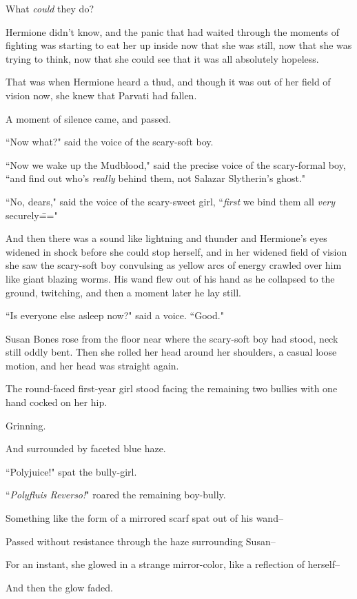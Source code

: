 What \emph{could} they do?

Hermione didn't know, and the panic that had waited through the moments of fighting was starting to eat her up inside now that she was still, now that she was trying to think, now that she could see that it was all absolutely hopeless.

That was when Hermione heard a thud, and though it was out of her field of vision now, she knew that Parvati had fallen.

A moment of silence came, and passed.

``Now what?" said the voice of the scary-soft boy.

``Now we wake up the Mudblood," said the precise voice of the scary-formal boy, ``and find out who's \emph{really} behind them, not Salazar Slytherin's ghost."

``No, dears," said the voice of the scary-sweet girl, ``\emph{first} we bind them all \emph{very} securely\==="

And then there was a sound like lightning and thunder and Hermione's eyes widened in shock before she could stop herself, and in her widened field of vision she saw the scary-soft boy convulsing as yellow arcs of energy crawled over him like giant blazing worms. His wand flew out of his hand as he collapsed to the ground, twitching, and then a moment later he lay still.

``Is everyone else asleep now?" said a voice. ``Good."

Susan Bones rose from the floor near where the scary-soft boy had stood, neck still oddly bent. Then she rolled her head around her shoulders, a casual loose motion, and her head was straight again.

The round-faced first-year girl stood facing the remaining two bullies with one hand cocked on her hip.

Grinning.

And surrounded by faceted blue haze.

``Polyjuice!" spat the bully-girl.

``\emph{Polyfluis Reverso!}" roared the remaining boy-bully.

Something like the form of a mirrored scarf spat out of his wand\---

Passed without resistance through the haze surrounding Susan\---

For an instant, she glowed in a strange mirror-color, like a reflection of herself\---

And then the glow faded.

